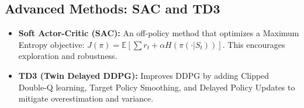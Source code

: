 \subsection{Advanced Methods: SAC and TD3}
\begin{itemize}
    \item \textbf{Soft Actor-Critic (SAC):} An off-policy method that optimizes a Maximum Entropy objective: $J(\pi) = \mathbb{E} [ \sum r_t + \alpha H(\pi(\cdot | S_t)) ]$. This encourages exploration and robustness.
    \item \textbf{TD3 (Twin Delayed DDPG):} Improves DDPG by adding Clipped Double-Q learning, Target Policy Smoothing, and Delayed Policy Updates to mitigate overestimation and variance.
\end{itemize}
